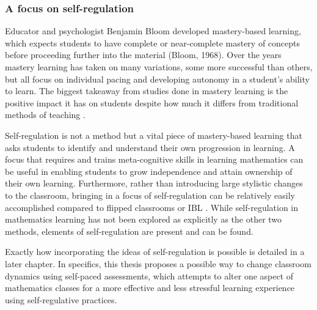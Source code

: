 \subsubsection{A focus on self-regulation}
Educator and psychologist Benjamin Bloom developed mastery-based learning, which expects students to have complete or near-complete mastery of concepts before proceeding further into the material (Bloom, 1968). Over the years mastery learning has taken on many variations, some more successful than others, but all focus on individual pacing and developing autonomy in a student's ability to learn. The biggest takeaway from studies done in mastery learning is the positive impact it has on students despite how much it differs from traditional methods of teaching \citep{zollinger_impact_2017}.

Self-regulation is not a method but a vital piece of mastery-based learning that asks students to identify and understand their own progression in learning. A focus that requires and trains meta-cognitive skills in learning mathematics can be useful in enabling students to grow independence and attain ownership of their own learning. Furthermore, rather than introducing large stylistic changes to the classroom, bringing in a focus of self-regulation can be relatively easily accomplished compared to flipped classrooms or IBL \citep{montague_self-regulation_2007}. While self-regulation in mathematics learning has not been explored as explicitly as the other two methods, elements of self-regulation are present and can be found.

Exactly how incorporating the ideas of self-regulation is possible is detailed  in a later chapter. In specifics, this thesis proposes a possible way to change classroom dynamics using self-paced assessments, which attempts to alter one aspect of mathematics classes for a more effective and less stressful learning experience using self-regulative practices.

